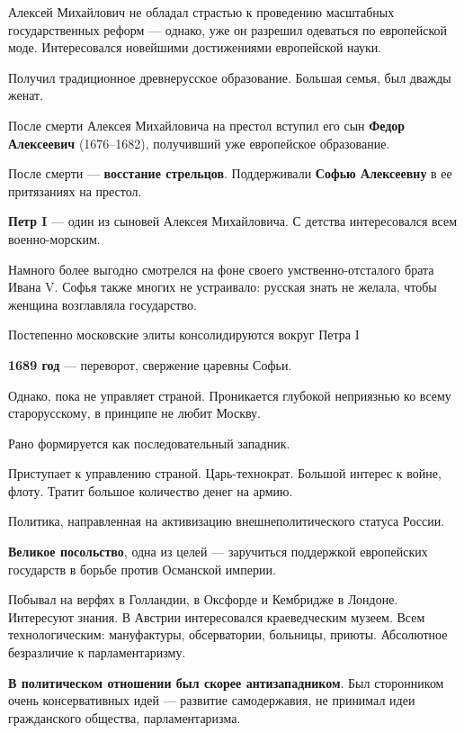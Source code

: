 \documentclass{article}
\begin{document}
\hfill

Алексей Михайлович не обладал страстью к проведению масштабных государственных реформ — однако, уже он разрешил одеваться по европейской моде. Интересовался новейшими достижениями европейской науки.

Получил традиционное древнерусское образование. Большая семья, был дважды женат.

\hfill

После смерти Алексея Михайловича на престол вступил его сын \textbf{Федор Алексеевич} (1676–1682), получивший уже европейское образование.

После смерти — \textbf{восстание стрельцов}. Поддерживали \textbf{Софью Алексеевну} в ее притязаниях на престол.

\hfill

\textbf{Петр I} — один из сыновей Алексея Михайловича. С детства интересовался всем военно-морским.

Намного более выгодно смотрелся на фоне своего умственно-отсталого брата Ивана V. Софья также многих не устраивало: русская знать не желала, чтобы женщина возглавляла государство.

Постепенно московские элиты консолидируются вокруг Петра I

\hfill

\textbf{1689 год} — переворот, свержение царевны Софьи.

Однако, пока не управляет страной. Проникается глубокой неприязнью ко всему старорусскому, в принципе не любит Москву.

Рано формируется как последовательный западник.

Приступает к управлению страной. Царь-технократ. Большой интерес к войне, флоту. Тратит большое количество денег на армию.

Политика, направленная на активизацию внешнеполитического статуса России.

\hfill

\textbf{Великое посольство}, одна из целей — заручиться поддержкой европейских государств в борьбе против Османской империи.

Побывал на верфях в Голландии, в Оксфорде и Кембридже в Лондоне. Интересуют знания. В Австрии интересовался краеведческим музеем. Всем технологическим: мануфактуры, обсерватории, больницы, приюты. Абсолютное безразличие к парламентаризму.

\textbf{В политическом отношении был скорее антизападником}. Был сторонником очень консервативных идей — развитие самодержавия, не принимал идеи гражданского общества, парламентаризма.
\end{document}
